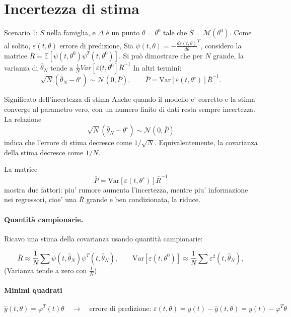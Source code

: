 \documentclass[11pt,a4paper]{article}
\begin{document}
\section{Incertezza di stima}

Scenario 1: $S$ nella famiglia, e $\Delta$ è un punto $\bar\theta=\theta^0$ tale che $S = \mathcal{M(\theta^0)}$. Come al solito, $\varepsilon(t, \theta)$ errore di predizione, Sia $\psi(t,\theta)=-\tfrac{d\varepsilon(t,\theta)}{d\theta}^{T}$, considero la matrice $\bar R=\mathbb{E}[\psi(t,\theta^0)\psi^{T}(t,\theta^0)]$. Si può dimostrare che per $N$ grande, la varianza di $\hat{\theta}_N$ tende a $\tfrac{1}{N}Var[\varepsilon(t,\theta^0]\bar{R}^{-1}$
In altri termini:
\[
\sqrt N(\hat\theta_N-\theta^\circ)\sim \mathcal{N}(0,\bar P),\qquad \bar P=\mathrm{Var}[\varepsilon(t,\theta^\circ)]\bar R^{-1}.
\]

\begin{spiegazione}{Significato dell'incertezza di stima}
Anche quando il modello e' corretto e la stima converge al parametro vero, con un numero finito di dati resta sempre incertezza. La relazione
\[
\sqrt N(\hat\theta_N-\theta^\circ)\sim \mathcal N(0,\bar P)
\]
indica che l'errore di stima decresce come $1/\sqrt N$. Equivalentemente, la covarianza della stima decresce come $1/N$.

La matrice
\[
\bar P=\mathrm{Var}[\varepsilon(t,\theta^\circ)]\bar R^{-1}
\]
mostra due fattori: piu' rumore aumenta l'incertezza, mentre piu' informazione nei regressori, cioe' una $\bar R$ grande e ben condizionata, la riduce.
\end{spiegazione}

\paragraph{Quantità campionarie.}
Ricavo una stima della covarianza usando quantità campionarie:

\[
\bar R\approx\frac{1}{N}\sum\psi(t,\hat\theta_N)\psi^{T}(t,\hat\theta_N),\qquad \mathrm{Var}[\varepsilon(t,\theta^0)]\approx\frac{1}{N}\sum\varepsilon^2(t,\hat\theta_N),
\]
(Varianza tende a zero con $\tfrac{1}{N}$)

\paragraph{Minimi quadrati}

\[
\hat y(t,\theta)=\varphi^{T}(t)\theta
 \quad \to \quad
\text{errore di predizione: }
\varepsilon(t,\theta)=y(t)-\hat y(t,\theta)=y(t)-\varphi^{T}\theta
\]
\end{document}
